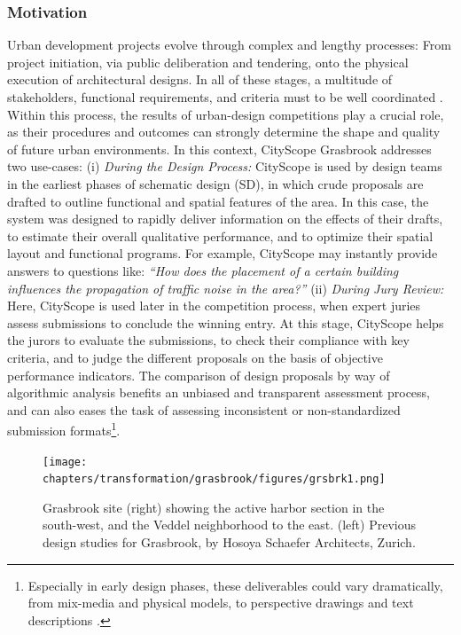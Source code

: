 {{        \subsubsection{Motivation}
        {
            Urban development projects evolve through complex and lengthy processes: From project initiation, via public deliberation and tendering, onto the physical execution of architectural designs. In all of these stages, a multitude of stakeholders, functional requirements, and criteria must to be well coordinated \cite{alexander1990planning}. Within this process, the results of urban-design competitions play a crucial role, as their procedures and outcomes can strongly determine the shape and quality of future urban environments.
            \newline
            In this context, CityScope Grasbrook addresses two use-cases: (i) \textit{During the Design Process:} CityScope is used by design teams in the earliest phases of schematic design (SD), in which crude proposals are drafted to outline functional and spatial features of the area. In this case, the system was designed to rapidly deliver information on the effects of their drafts, to estimate their overall qualitative performance, and to optimize their spatial layout and functional programs. For example, CityScope may instantly provide answers to questions like: \textit{``How does the placement of a certain building influences the propagation of traffic noise in the area?''}
            \newline
            (ii) \textit{During Jury Review:} Here, CityScope is used later in the competition process, when expert juries assess submissions to conclude the winning entry. At this stage, CityScope helps the jurors to evaluate the submissions, to check their compliance with key criteria, and to judge the different proposals on the basis of objective performance indicators. The comparison of design proposals by way of algorithmic analysis benefits an unbiased and transparent assessment process, and can also eases the task of assessing inconsistent or non-standardized submission formats\footnote{Especially in early design phases, these deliverables could vary dramatically, from mix-media and physical models, to perspective drawings and text descriptions \cite{ben-joseph2001}.}.
        }
    }

    \begin{figure}[!htb]
        \begin{center}
            \texttt{[image: chapters/transformation/grasbrook/figures/grsbrk1.png]}
        \end{center}
        \caption{Grasbrook site (right) showing the active harbor section in the south-west, and the Veddel neighborhood to the east. (left) Previous design studies for Grasbrook, by Hosoya Schaefer Architects, Zurich.}
        \label{fig:grasbrook_site}
    \end{figure}

}
